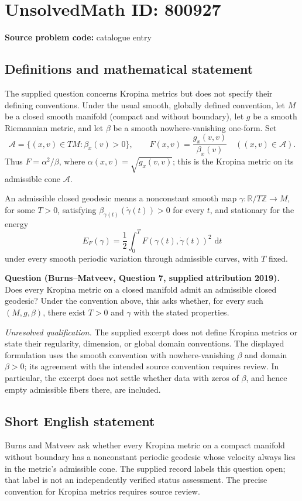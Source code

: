 \documentclass[11pt]{article}
\newcommand{\Z}{\mathbb{Z}}
\newcommand{\R}{\mathbb{R}}
\newcommand{\dd}{\,\mathrm{d}}
\begin{document}
\section*{UnsolvedMath ID: 800927}
\textbf{Source problem code:} catalogue entry
\subsection{Definitions and mathematical statement}
The supplied question concerns Kropina metrics but does not specify their defining conventions. Under the usual smooth, globally defined convention, let \(M\) be a closed smooth manifold (compact and without boundary), let \(g\) be a smooth Riemannian metric, and let \(\beta\) be a smooth nowhere-vanishing one-form. Set
\[
\mathcal A=\{(x,v)\in TM:\beta_x(v)>0\},\qquad F(x,v)=\frac{g_x(v,v)}{\beta_x(v)}\quad ((x,v)\in\mathcal A).
\]
Thus \(F=\alpha^2/\beta\), where \(\alpha(x,v)=\sqrt{g_x(v,v)}\); this is the Kropina metric on its admissible cone \(\mathcal A\).

An admissible closed geodesic means a nonconstant smooth map \(\gamma:\R/T\Z\to M\), for some \(T>0\), satisfying \(\beta_{\gamma(t)}(\dot\gamma(t))>0\) for every \(t\), and stationary for the energy
\[
E_F(\gamma)=\frac12\int_0^T F(\gamma(t),\dot\gamma(t))^2\,\dd t
\]
under every smooth periodic variation through admissible curves, with \(T\) fixed.

\textbf{Question (Burns--Matveev, Question 7, supplied attribution 2019).} Does every Kropina metric on a closed manifold admit an admissible closed geodesic? Under the convention above, this asks whether, for every such \((M,g,\beta)\), there exist \(T>0\) and \(\gamma\) with the stated properties.

\textit{Unresolved qualification.} The supplied excerpt does not define Kropina metrics or state their regularity, dimension, or global domain conventions. The displayed formulation uses the smooth convention with nowhere-vanishing \(\beta\) and domain \(\beta>0\); its agreement with the intended source convention requires review. In particular, the excerpt does not settle whether data with zeros of \(\beta\), and hence empty admissible fibers there, are included.
\subsection{Short English statement}
Burns and Matveev ask whether every Kropina metric on a compact manifold without boundary has a nonconstant periodic geodesic whose velocity always lies in the metric's admissible cone. The supplied record labels this question open; that label is not an independently verified status assessment. The precise convention for Kropina metrics requires source review.
\end{document}
